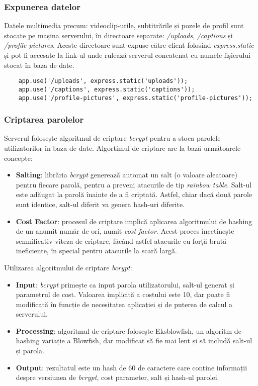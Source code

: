\subsubsection{Expunerea datelor}
Datele multimedia precum: videoclip-urile, subtitrările și pozele de profil sunt stocate 
pe mașina serverului, în directoare separate: \textit{/uploads}, \textit{/captions} și
\textit{/profile-pictures}. Aceste directoare sunt expuse către client folosind
\textit{express.static} și pot fi accesate la link-ul unde rulează serverul concatenat
cu numele fișierului stocat în baza de date.


\begin{verbatim}
    app.use('/uploads', express.static('uploads'));
    app.use('/captions', express.static('captions'));
    app.use('/profile-pictures', express.static('profile-pictures'));
\end{verbatim}

\subsubsection{Criptarea parolelor}
Serverul folosește algoritmul de criptare \textit{bcrypt} pentru a stoca parolele utilizatorilor
în baza de date. Algortimul de criptare are la bază următoarele concepte:

\begin{itemize}
    \item \textbf{Salting}: librăria \textit{bcrypt} generează automat un salt (o valoare aleatoare)
    pentru fiecare parolă, pentru a preveni atacurile de tip \textit{rainbow table}. Salt-ul este
    adăugat la parolă înainte de a fi criptată. Astfel, chiar dacă două parole sunt identice,
    salt-ul diferit va genera hash-uri diferite.
    \item \textbf{Cost Factor}: procesul de criptare implică aplicarea algoritmului de hashing
    de un anumit număr de ori, numit \textit{cost factor}. Acest proces încetinește semnificativ
    viteza de criptare, făcând astfel atacurile cu forță brută ineficiente, în special pentru
    atacurile la scară largă.
\end{itemize}

\par
Utilizarea algoritmului de criptare \textit{bcrypt}:

\begin{itemize}
    \item \textbf{Input}: \textit{bcrypt} primește ca input parola utilizatorului, salt-ul generat
    și parametrul de cost. Valoarea implicită a costului este 10, dar poate fi modificată în funcție
    de necesitatea aplicației și de puterea de calcul a serverului.
    \item \textbf{Processing}: algoritmul de criptare folosește Eksblowfish, un algoritm de hashing
    variație a Blowfish, dar modificat să fie mai lent și să includă salt-ul și parola.
    \item \textbf{Output}: rezultatul este un hash de 60 de caractere care conține informații despre
    versiunea de \textit{bcrypt}, cost parameter, salt și hash-ul parolei.
\end{itemize}

